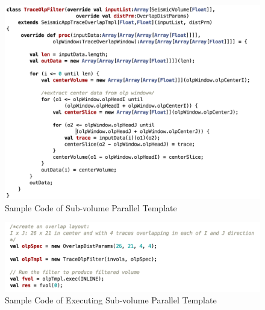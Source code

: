 \begin{figure}[h]
\centering
\includegraphics[scale=0.65]{figures/code_tmpl_subv.png}
\caption{Sample Code of Sub-volume Parallel Template}
\label{code_tmpl_subv}
\end{figure}

\begin{figure}[h]
\centering
\includegraphics[scale=0.65]{figures/code_run_subv.png}
\caption{Sample Code of Executing Sub-volume Parallel Template}
\label{code_run_subv}
\end{figure}


